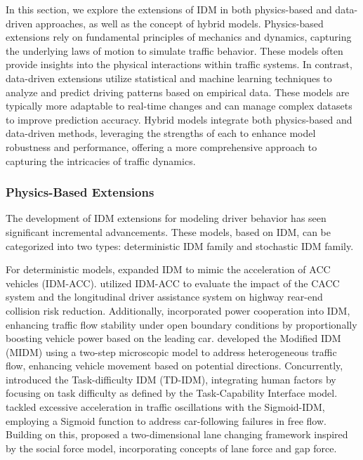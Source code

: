 \documentclass[a4paper,fleqn]{cas-sc}
\begin{document}
In this section, we explore the extensions of IDM in both physics-based and data-driven approaches, as well as the concept of hybrid models. Physics-based extensions rely on fundamental principles of mechanics and dynamics, capturing the underlying laws of motion to simulate traffic behavior. These models  often  provide insights into the physical interactions within traffic systems. In contrast, data-driven extensions utilize statistical and machine learning techniques to analyze and predict driving patterns based on empirical data. These models are typically more adaptable to real-time changes and can manage complex datasets to improve prediction accuracy. Hybrid models integrate both physics-based and data-driven methods, leveraging the strengths of each to enhance model robustness and performance, offering a more comprehensive approach to capturing the intricacies of traffic dynamics.
 
\subsubsection{Physics-Based Extensions}

The development of IDM extensions for modeling driver behavior has seen significant incremental advancements. These models, based on IDM, can be categorized into two types: deterministic IDM family and stochastic IDM family.

For deterministic models, \cite{kestingAdaptiveCruiseControlDesign2008} expanded IDM to mimic the acceleration of ACC vehicles (IDM-ACC). \cite{li_evaluating_2017,li_evaluation_2017} utilized IDM-ACC to evaluate the impact of the CACC system and the longitudinal driver assistance system on highway rear-end collision risk reduction. Additionally, \cite{li_stability_2015} incorporated power cooperation into IDM, enhancing traffic flow stability under open boundary conditions by proportionally boosting vehicle power based on the leading car. \cite{sarkar_microscopic_2020} developed the Modified IDM (MIDM) using a two-step microscopic model to address heterogeneous traffic flow, enhancing vehicle movement based on potential directions. Concurrently, \cite{saifuzzamanIncorporatingHumanFactorsCarFollowingModels2014c} introduced the Task-difficulty IDM (TD-IDM), integrating human factors by focusing on task difficulty as defined by the Task-Capability Interface model. \cite{chen_sigmoid-based_2024} tackled excessive acceleration in traffic oscillations with the Sigmoid-IDM, employing a Sigmoid function to address car-following failures in free flow. Building on this, \cite{chen_two-dimensional_2024} proposed a two-dimensional lane changing framework inspired by the social force model, incorporating concepts of lane force and gap force.
\end{document}
